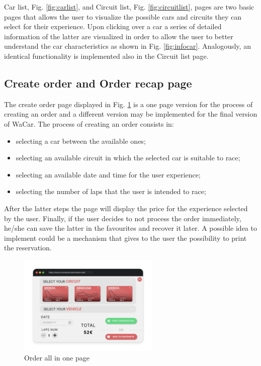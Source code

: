 Car list, Fig. \ref{fig:carlist}, and Circuit list, Fig. \ref{fig:circuitlist}, pages are two basic pages that allows the user to visualize the possible cars and circuits they can select for their experience. Upon clicking over a car a series of detailed information of the latter are visualized in order to allow the user to better understand the car characteristics as shown in Fig. \ref{fig:infocar}. Analogously, an identical functionality is implemented also in the Circuit list page.

\subsection{Create order and Order recap page}

The create order page displayed in Fig. \ref{fig:allinone} is a one page version for the process of creating an order and a different version may be implemented for the final version of WaCar. The process of creating an order consists in:

\begin{itemize}
    \item selecting a car between the available ones;
    \item selecting an available circuit in which the selected car is suitable to race;
    \item selecting an available date and time for the user experience;
    \item selecting the number of laps that the user is intended to race;
\end{itemize}

After the latter steps the page will display the price for the experience selected by the user. Finally, if the user decides to not process the order immediately, he/she can save the latter in the favourites and recover it later. A possible idea to implement could be a mechanism that gives to the user the possibility to print the reservation.

\begin{figure}[h]
    \centering
    \includegraphics[width=0.6\textwidth]{mockup/OrderAllInOne.png}
    \caption{Order all in one page}
    \label{fig:allinone}
\end{figure}